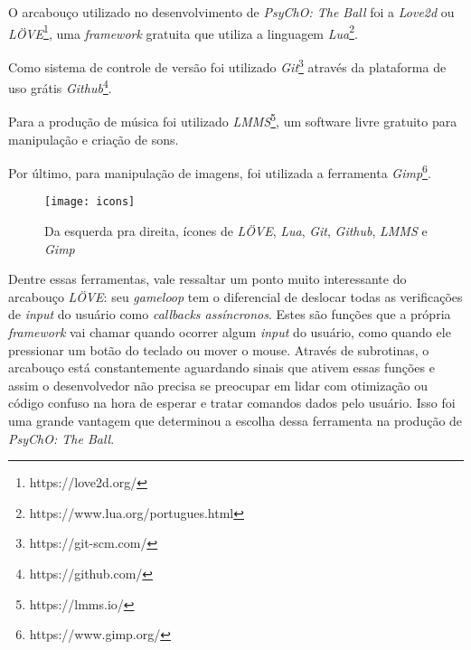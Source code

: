 O arcabouço utilizado no desenvolvimento de \textit{PsyChO: The Ball} foi a \textit{Love2d} ou \textit{LÖVE}\footnote{https://love2d.org/}, uma \textit{framework} gratuita que utiliza a linguagem \textit{Lua}\footnote{https://www.lua.org/portugues.html}.

Como sistema de controle de versão foi utilizado \textit{Git}\footnote{https://git-scm.com/} através da plataforma de uso grátis \textit{Github}\footnote{https://github.com/}.

Para a produção de música foi utilizado \textit{LMMS}\footnote{https://lmms.io/}, um software livre gratuito para manipulação e criação de sons.

Por último, para manipulação de imagens, foi utilizada a ferramenta \textit{Gimp}\footnote{https://www.gimp.org/}.

\begin{figure}[h!]
\texttt{[image: icons]}
\centering
\caption{Da esquerda pra direita, ícones de \textit{LÖVE}, \textit{Lua}, \textit{Git}, \textit{Github}, \textit{LMMS} e \textit{Gimp}}
\end{figure}

Dentre essas ferramentas, vale ressaltar um ponto muito interessante do arcabouço \textit{LÖVE}: seu \textit{gameloop} tem o diferencial de deslocar todas as verificações de \textit{input} do usuário como \textit{callbacks assíncronos}. Estes são funções que a própria \textit{framework} vai chamar quando ocorrer algum \textit{input} do usuário, como quando ele pressionar um botão do teclado ou mover o mouse. Através de subrotinas, o arcabouço está constantemente aguardando sinais que ativem essas funções e assim o desenvolvedor não precisa se preocupar em lidar com otimização ou código confuso na hora de esperar e tratar comandos dados pelo usuário. Isso foi uma grande vantagem que determinou a escolha dessa ferramenta na produção de \textit{PsyChO: The Ball}.

